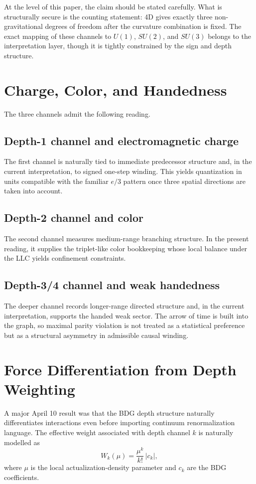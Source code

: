 \documentclass[11pt]{article}
\begin{document}
At the level of this paper, the claim should be stated carefully. What is structurally secure is the counting statement: 4D gives exactly three non-gravitational degrees of freedom after the curvature combination is fixed. The exact mapping of these channels to $U(1)$, $SU(2)$, and $SU(3)$ belongs to the interpretation layer, though it is tightly constrained by the sign and depth structure.

\section{Charge, Color, and Handedness}
The three channels admit the following reading.

\subsection{Depth-1 channel and electromagnetic charge}
The first channel is naturally tied to immediate predecessor structure and, in the current interpretation, to signed one-step winding. This yields quantization in units compatible with the familiar $e/3$ pattern once three spatial directions are taken into account.

\subsection{Depth-2 channel and color}
The second channel measures medium-range branching structure. In the present reading, it supplies the triplet-like color bookkeeping whose local balance under the LLC yields confinement constraints.

\subsection{Depth-3/4 channel and weak handedness}
The deeper channel records longer-range directed structure and, in the current interpretation, supports the handed weak sector. The arrow of time is built into the graph, so maximal parity violation is not treated as a statistical preference but as a structural asymmetry in admissible causal winding.

\section{Force Differentiation from Depth Weighting}
A major April 10 result was that the BDG depth structure naturally differentiates interactions even before importing continuum renormalization language. The effective weight associated with depth channel $k$ is naturally modelled as
\begin{equation}
W_k(\mu)=\frac{\mu^k}{k!}\, |c_k|,
\end{equation}
where $\mu$ is the local actualization-density parameter and $c_k$ are the BDG coefficients.
\end{document}
